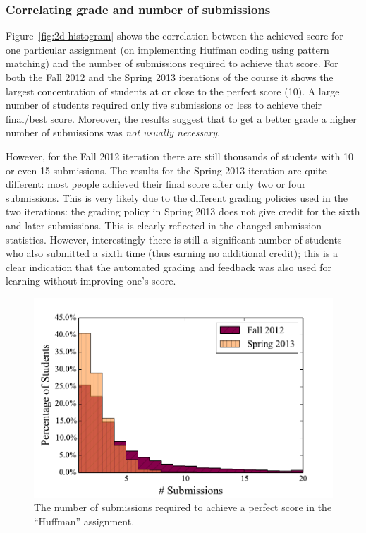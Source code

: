 \documentclass{sig-alternate}
\begin{document}
\subsubsection{Correlating grade and number of submissions}

Figure~\ref{fig:2d-histogram} shows the correlation between the achieved
score for one particular assignment (on implementing Huffman coding using
pattern matching) and the number of submissions required to achieve that
score. For both the Fall 2012 and the Spring 2013 iterations of the course it
shows the largest concentration of students at or close to the perfect score
(10). A large number of students required only five submissions or less to
achieve their final/best score. Moreover, the results suggest that to get a
better grade a higher number of submissions was {\em not usually necessary}.

However, for the Fall 2012 iteration there are still thousands of students
with 10 or even 15 submissions. The results for the Spring 2013 iteration are
quite different: most people achieved their final score after only two or four
submissions. This is very likely due to the different grading policies used in
the two iterations: the grading policy in Spring 2013 does not give credit for
the sixth and later submissions. This is clearly reflected in the changed
submission statistics. However, interestingly there is still a significant
number of students who also submitted a sixth time (thus earning no additional
credit); this is a clear indication that the automated grading and feedback
was also used for learning without improving one's score.

\begin{figure}[ht!]
  \centering
  \includegraphics[width=\columnwidth]{plots/top-scores-submissions-histogram.pdf}
  \caption{The number of submissions required to achieve a perfect score in the ``Huffman'' assignment.}
  \label{fig:top-scores-submissions}
\end{figure}
\end{document}
